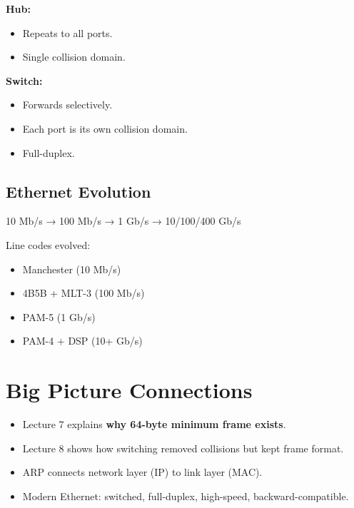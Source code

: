 \documentclass[11pt]{article}
\begin{document}
\textbf{Hub:}
\begin{itemize}
    \item Repeats to all ports.
    \item Single collision domain.
\end{itemize}

\textbf{Switch:}
\begin{itemize}
    \item Forwards selectively.
    \item Each port is its own collision domain.
    \item Full-duplex.
\end{itemize}

\subsection{Ethernet Evolution}

10 Mb/s → 100 Mb/s → 1 Gb/s → 10/100/400 Gb/s

Line codes evolved:
\begin{itemize}
    \item Manchester (10 Mb/s)
    \item 4B5B + MLT-3 (100 Mb/s)
    \item PAM-5 (1 Gb/s)
    \item PAM-4 + DSP (10+ Gb/s)
\end{itemize}

\section*{Big Picture Connections}

\begin{itemize}
    \item Lecture 7 explains \textbf{why 64-byte minimum frame exists}.
    \item Lecture 8 shows how switching removed collisions but kept frame format.
    \item ARP connects network layer (IP) to link layer (MAC).
    \item Modern Ethernet: switched, full-duplex, high-speed, backward-compatible.
\end{itemize}
\end{document}
